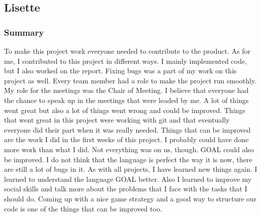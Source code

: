 \newpage
\subsection{Lisette}
\subsubsection{Summary}
To make this project work everyone needed to contribute to the product. As for me, I contributed to this project in different ways. I mainly implemented code, but I also worked on the report. Fixing bugs was a part of my work on this project as well. 
Every team member had a role to make the project run smoothly. My role for the meetings was the Chair of Meeting. I believe that everyone had the chance to speak up in the meetings that were leaded by me.
A lot of things went great but also a lot of things went wrong and could be improved. Things that went great in this project were working with git and that eventually everyone did their part when it was really needed. 
Things that can be improved are the work I did in the first weeks of this project. I probably could have done more work than what I did. Not everything was on us, though. GOAL could also be improved. I do not think that the language is perfect the way it is now, there are still a lot of bugs in it.
As with all projects, I have learned new things again. I learned to understand the language GOAL better. Also I learned to improve my social skills and talk more about the problems that I face with the tasks that I should do. Coming up with a nice game strategy and a good way to structure our code is one of the things that can be improved too.
